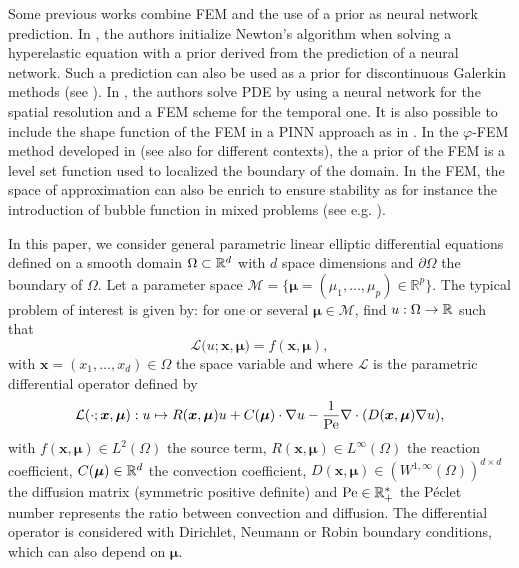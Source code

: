
Some previous works combine FEM and the use of a prior as neural network prediction.
In \cite{brunet2019physics}, the authors initialize Newton's algorithm when solving a hyperelastic equation with a prior derived from the prediction of a neural network. Such a prediction can also be used as a prior for discontinuous Galerkin methods (see \cite{FraMicNav2024}).
In \cite{feng_hybrid_2024}, the authors solve PDE by using a neural network for the spatial resolution and a FEM scheme for the temporal one. It is also possible to include the shape function of the FEM in a PINN approach as in \cite{skardova_finite_2024}.
In the $\varphi$-FEM method developed in \cite{duprez2020phi} (see also \cite{cotin2023phi,duprez2023new,DupLleLozVui2023,duprez2023phi} for different contexts), the a prior of the FEM is a level set function used to localized the boundary of the domain.
In the FEM, the space of approximation can also be enrich to ensure stability as for instance the introduction of bubble function in mixed problems (see e.g. \cite{Ern2004TheoryAP}).

In this paper, we consider general parametric linear elliptic differential equations
defined on a smooth domain $\Omega \subset \mathbb{R}^d$
with $d$ space dimensions and $\partial\Omega$ the boundary of $\Omega$.
Let a parameter space $\mathcal{M}=\{\bm{\mu}=(\mu_1,\ldots,\mu_p)\in \mathbb{R}^p\}$.
The typical problem of interest is given by:
for one or several  $\bm{\mu}\in \mathcal{M}$, find $u: \Omega\to \mathbb{R}$ such that
\begin{equation}
    \label{eq:ob_pde}
		\mathcal{L}\big(u;\bm{x},\bm{\mu}\big) = f(\bm{x},\bm{\mu}),
\end{equation}
with $\bm{x}=(x_1,\dots,x_d)\in\Omega$ the space variable and where $\mathcal{L}$ is the parametric differential operator defined  by
\begin{equation*}
    \mathcal{L}(\cdot;\bm{x},\bm{\mu}) : u \mapsto R(\bm{x},\bm{\mu}) u + C(\bm{\mu}) \cdot \nabla u - \frac{1}{\text{Pe}} \nabla \cdot (D(\bm{x},\bm{\mu}) \nabla u),
\end{equation*}
with $f(\bm{x},\bm{\mu})\in L^2(\Omega)$ the source term,
$R(\bm{x},\bm{\mu})\in L^{\infty}(\Omega)
$ the reaction coefficient,
$C(\bm{\mu}) \in \R^d%
$ the convection coefficient,
$D(\bm{x},\bm{\mu}) \in {(W^{1,\infty}(\Omega))}^{d\times d}
$ the diffusion matrix (symmetric positive definite)
and $\text{Pe} \in \mathbb{R}_+^*$ the Péclet number represents the ratio between convection and diffusion.
The differential operator is considered with Dirichlet, Neumann or Robin boundary conditions, which can also depend on $\bm{\mu}$.

